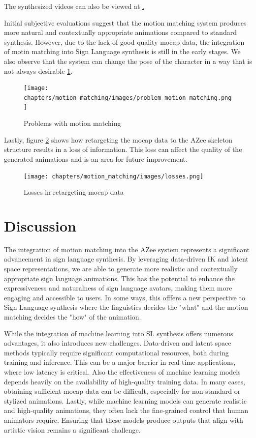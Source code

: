\documentclass[../../main.tex]{subfiles}
\begin{document}
The synthesized videos can also be viewed at \href{todo}.

Initial subjective evaluations suggest that the motion matching system produces more natural and contextually appropriate animations compared to standard synthesis. However, due to the lack of good quality mocap data, the integration of motin matching into Sign Language synthesis is still in the early stages. We also observe that the system can change the pose of the character in a way that is not always desirable \ref{fig:problem_motion_matching}.

\begin{figure}
  \centering \texttt{[image: chapters/motion\_matching/images/problem\_motion\_matching.png]}
  \caption{Problems with motion matching}
  \label{fig:problem_motion_matching}
\end{figure}

Lastly, figure \ref{fig:losses} shows how retargeting the mocap data to the AZee skeleton structure results in a loss of information. This loss can affect the quality of the generated animations and is an area for future improvement.

\begin{figure}
  \centering \texttt{[image: chapters/motion\_matching/images/losses.png]}
  \caption{Losses in retargeting mocap data}
  \label{fig:losses}
\end{figure}

\section{Discussion}
\label{ch:motion_matching:discussion}

The integration of motion matching into the AZee system represents a significant advancement in sign language synthesis. By leveraging data-driven IK and latent space representations, we are able to generate more realistic and contextually appropriate sign language animations. This has the potential to enhance the expressiveness and naturalness of sign language avatars, making them more engaging and accessible to users. In some ways, this offfers a new perspective to Sign Language synthesis where the linguistics decides the "what" and the motion matching decides the "how" of the animation.

While the integration of machine learning into SL synthesis offers numerous advantages, it also introduces new challenges. Data-driven and latent space methods typically require significant computational resources, both during training and inference. This can be a major barrier in real-time applications, where low latency is critical. Also the effectiveness of machine learning models depends heavily on the availability of high-quality training data. In many cases, obtaining sufficient mocap data can be difficult, especially for non-standard or stylized animations. Lastly, while machine learning models can generate realistic and high-quality animations, they often lack the fine-grained control that human animators require. Ensuring that these models produce outputs that align with artistic vision remains a significant challenge.
\end{document}
